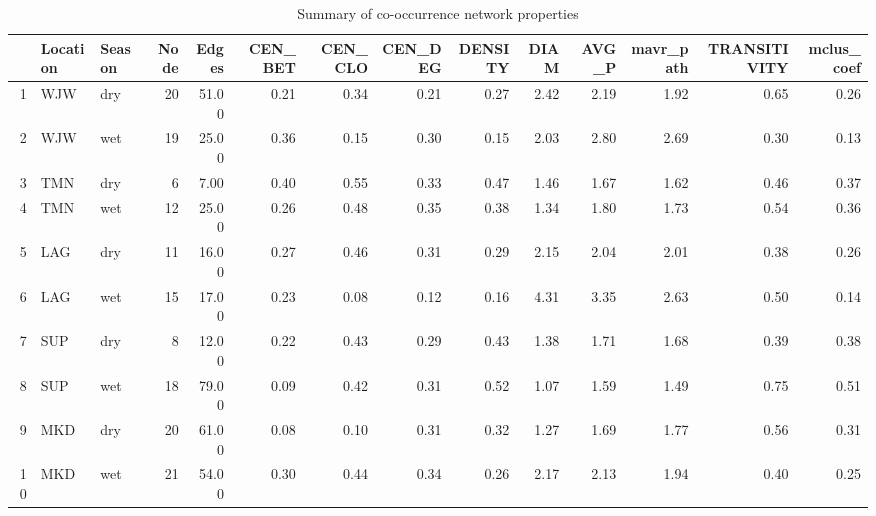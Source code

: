 \begin{table}
\centering
\begin{tabular}{rllrrrrrrrrrrr}
  \hline
    & Location & Season & Node & Edges & CEN\_BET & CEN\_CLO & CEN\_DEG & DENSITY & DIAM & AVG\_P & mavr\_path & TRANSITIVITY & mclus\_coef \\ 
  \hline
  1 & WJW & dry &  20 & 51.00 & 0.21 & 0.34 & 0.21 & 0.27 & 2.42 & 2.19 & 1.92 & 0.65 & 0.26 \\ 
  2 & WJW & wet &  19 & 25.00 & 0.36 & 0.15 & 0.30 & 0.15 & 2.03 & 2.80 & 2.69 & 0.30 & 0.13 \\ 
  3 & TMN & dry &   6 & 7.00 & 0.40 & 0.55 & 0.33 & 0.47 & 1.46 & 1.67 & 1.62 & 0.46 & 0.37 \\ 
  4 & TMN & wet &  12 & 25.00 & 0.26 & 0.48 & 0.35 & 0.38 & 1.34 & 1.80 & 1.73 & 0.54 & 0.36 \\ 
  5 & LAG & dry &  11 & 16.00 & 0.27 & 0.46 & 0.31 & 0.29 & 2.15 & 2.04 & 2.01 & 0.38 & 0.26 \\ 
  6 & LAG & wet &  15 & 17.00 & 0.23 & 0.08 & 0.12 & 0.16 & 4.31 & 3.35 & 2.63 & 0.50 & 0.14 \\ 
  7 & SUP & dry &   8 & 12.00 & 0.22 & 0.43 & 0.29 & 0.43 & 1.38 & 1.71 & 1.68 & 0.39 & 0.38 \\ 
  8 & SUP & wet &  18 & 79.00 & 0.09 & 0.42 & 0.31 & 0.52 & 1.07 & 1.59 & 1.49 & 0.75 & 0.51 \\ 
  9 & MKD & dry &  20 & 61.00 & 0.08 & 0.10 & 0.31 & 0.32 & 1.27 & 1.69 & 1.77 & 0.56 & 0.31 \\ 
  10 & MKD & wet &  21 & 54.00 & 0.30 & 0.44 & 0.34 & 0.26 & 2.17 & 2.13 & 1.94 & 0.40 & 0.25 \\ 
   \hline
\end{tabular}
\caption{Summary of co-occurrence network properties}
\label{table:Network_stat}
\end{table}

